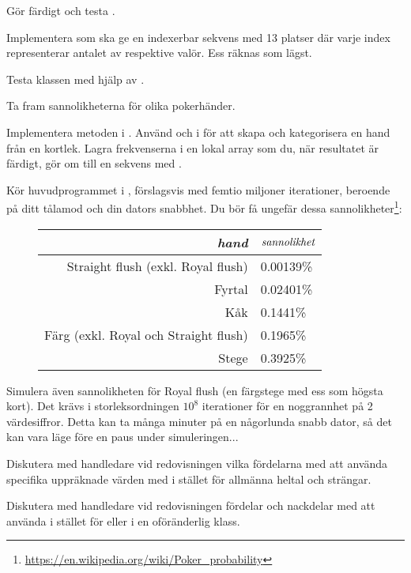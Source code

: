 \Task Gör färdigt och testa .

\Subtask Implementera  som ska ge en indexerbar sekvens med 13 platser där varje index representerar antalet av respektive valör. Ess räknas som lägst.

\Subtask Testa klassen  med hjälp av .

\Task Ta fram sannolikheterna för olika pokerhänder.

\Subtask Implementera metoden  i . Använd  och  i  för att skapa och kategorisera en hand från en kortlek. Lagra frekvenserna i en lokal array som du, när resultatet är färdigt, gör om till en sekvens med .

\Subtask Kör huvudprogrammet i , förslagsvis med femtio miljoner iterationer, beroende på ditt tålamod och din dators snabbhet. Du bör få ungefär dessa sannolikheter\footnote{\url{https://en.wikipedia.org/wiki/Poker_probability}}:
\begin{figure}[H]\centering
\begin{tabular}{r|l}
\emph{hand} & $\emph{sannolikhet}$ \\ \hline
Straight flush (exkl. Royal flush) & 0.00139\%  \\
Fyrtal         & 0.02401\%    \\
Kåk            & 0.1441\%    \\
Färg (exkl. Royal och Straight flush)         & 0.1965\%    \\
Stege       & 0.3925\%     \\
\end{tabular}
\end{figure}

\Task Simulera även sannolikheten för Royal flush (en färgstege med ess som högsta kort). Det krävs i storleksordningen $10^8$ iterationer för en noggrannhet på 2 värdesiffror. Detta kan ta många minuter på en någorlunda snabb dator, så det kan vara läge före en paus under simuleringen...

\Task Diskutera med handledare vid redovisningen vilka fördelarna med att använda specifika uppräknade värden med  i stället för allmänna heltal och strängar.

\Task Diskutera med handledare vid redovisningen fördelar och nackdelar med att använda  i stället för  eller  i en oföränderlig klass.


